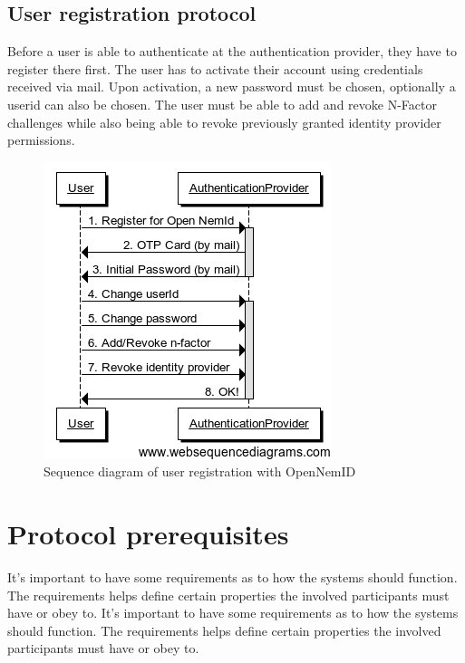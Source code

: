 \documentclass[twosided]{report}
\begin{document}
\subsection{User registration protocol}
Before a user is able to authenticate at the authentication provider, they have to register there first. The user has to activate their account using credentials received via mail. Upon activation, a new password must be chosen, optionally a userid can also be chosen. The user must be able to add and revoke N-Factor challenges while also being able to revoke previously granted identity provider permissions.

\begin{figure}[H]
	\centering
	\includegraphics[scale=0.6]{images/Open-NemId-(User-Registration).png}
	\caption{Sequence diagram of user registration with OpenNemID}
\end{figure}

\section{Protocol prerequisites}
It's important to have some requirements as to how the systems should function. The requirements helps define certain properties the involved participants must have or obey to.
It's important to have some requirements as to how the systems should function. The requirements helps define certain properties the involved participants must have or obey to.
\end{document}

